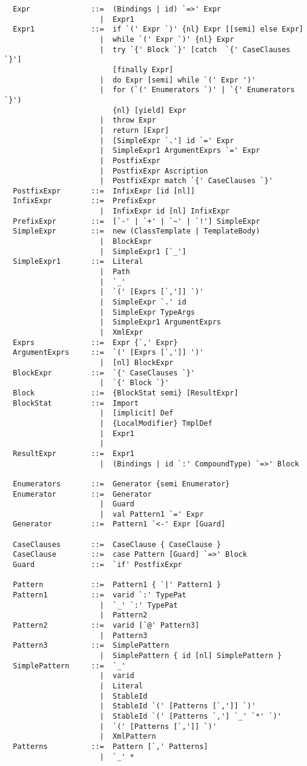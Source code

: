 {\begin{lstlisting}
  Expr              ::=  (Bindings | id) `=>' Expr
                      |  Expr1
  Expr1             ::=  if `(' Expr `)' {nl} Expr [[semi] else Expr]
                      |  while `(' Expr `)' {nl} Expr
                      |  try `{' Block `}' [catch  `{' CaseClauses `}'] 
                         [finally Expr]
                      |  do Expr [semi] while `(' Expr ')'
                      |  for (`(' Enumerators `)' | `{' Enumerators `}') 
                         {nl} [yield] Expr
                      |  throw Expr
                      |  return [Expr]
                      |  [SimpleExpr `.'] id `=' Expr
                      |  SimpleExpr1 ArgumentExprs `=' Expr
                      |  PostfixExpr
                      |  PostfixExpr Ascription
                      |  PostfixExpr match `{' CaseClauses `}'
  PostfixExpr       ::=  InfixExpr [id [nl]]
  InfixExpr         ::=  PrefixExpr
                      |  InfixExpr id [nl] InfixExpr
  PrefixExpr        ::=  [`-' | `+' | `~' | `!'] SimpleExpr 
  SimpleExpr        ::=  new (ClassTemplate | TemplateBody)
                      |  BlockExpr
                      |  SimpleExpr1 [`_']
  SimpleExpr1       ::=  Literal
                      |  Path
                      |  `_'
                      |  `(' [Exprs [`,']] `)'
                      |  SimpleExpr `.' id 
                      |  SimpleExpr TypeArgs
                      |  SimpleExpr1 ArgumentExprs
                      |  XmlExpr
  Exprs             ::=  Expr {`,' Expr}
  ArgumentExprs     ::=  `(' [Exprs [`,']] ')'
                      |  [nl] BlockExpr
  BlockExpr         ::=  `{' CaseClauses `}'
                      |  `{' Block `}'
  Block             ::=  {BlockStat semi} [ResultExpr]
  BlockStat         ::=  Import
                      |  [implicit] Def
                      |  {LocalModifier} TmplDef
                      |  Expr1
                      |
  ResultExpr        ::=  Expr1
                      |  (Bindings | id `:' CompoundType) `=>' Block

  Enumerators       ::=  Generator {semi Enumerator}
  Enumerator        ::=  Generator
                      |  Guard
                      |  val Pattern1 `=' Expr
  Generator         ::=  Pattern1 `<-' Expr [Guard]

  CaseClauses       ::=  CaseClause { CaseClause }
  CaseClause        ::=  case Pattern [Guard] `=>' Block 
  Guard             ::=  `if' PostfixExpr

  Pattern           ::=  Pattern1 { `|' Pattern1 }
  Pattern1          ::=  varid `:' TypePat
                      |  `_' `:' TypePat
                      |  Pattern2
  Pattern2          ::=  varid [`@' Pattern3]
                      |  Pattern3
  Pattern3          ::=  SimplePattern
                      |  SimplePattern { id [nl] SimplePattern }
  SimplePattern     ::=  `_'
                      |  varid
                      |  Literal
                      |  StableId
                      |  StableId `(' [Patterns [`,']] `)'
                      |  StableId `(' [Patterns `,'] `_' `*' `)'
                      |  `(' [Patterns [`,']] `)'
                      |  XmlPattern
  Patterns          ::=  Pattern [`,' Patterns]
                      |  `_' *


\end{lstlisting}}
